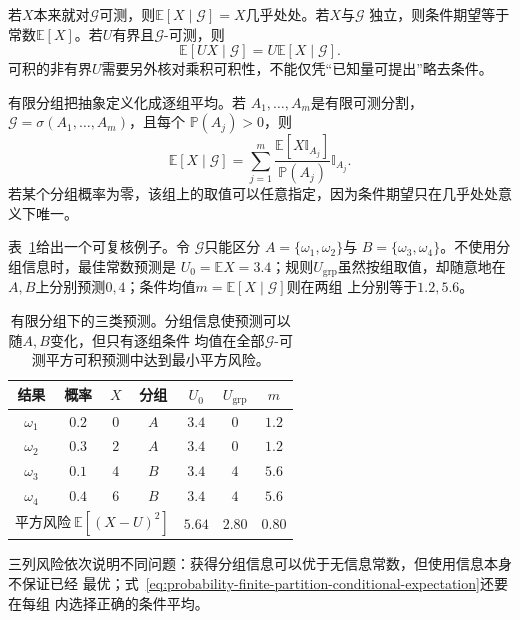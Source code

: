 若\(X\)本来就对\(\mathcal{G}\)可测，则\(\mathbb{E}[X\mid\mathcal{G}]=X\)几乎处处。若\(X\)与\(\mathcal{G}\)
独立，则条件期望等于常数\(\mathbb{E}[X]\)。若\(U\)有界且\(\mathcal{G}\)-可测，则
\begin{equation}
  \mathbb{E}[UX\mid\mathcal{G}]
  =
  U\mathbb{E}[X\mid\mathcal{G}].
  \label{eq:probability-taking-out-known-factor}
\end{equation}
可积的非有界\(U\)需要另外核对乘积可积性，不能仅凭“已知量可提出”略去条件。

有限分组把抽象定义化成逐组平均。若
\(A_1,\ldots,A_m\)是有限可测分割，
\(\mathcal{G}=\sigma(A_1,\ldots,A_m)\)，且每个
\(\mathbb{P}(A_j)>0\)，则
\begin{equation}
  \mathbb{E}[X\mid\mathcal{G}]
  =
  \sum_{j=1}^{m}
  \frac{\mathbb{E}[X\mathbb{I}_{A_j}]}
       {\mathbb{P}(A_j)}
  \mathbb{I}_{A_j}.
  \label{eq:probability-finite-partition-conditional-expectation}
\end{equation}
若某个分组概率为零，该组上的取值可以任意指定，因为条件期望只在几乎处处意义下唯一。

表~\ref{tab:probability-finite-partition-predictions}给出一个可复核例子。令
\(\mathcal{G}\)只能区分
\(A=\{\omega_1,\omega_2\}\)与
\(B=\{\omega_3,\omega_4\}\)。不使用分组信息时，最佳常数预测是
\(U_0=\mathbb{E}X=3.4\)；规则\(U_{\mathrm{grp}}\)虽然按组取值，却随意地在
\(A,B\)上分别预测\(0,4\)；条件均值\(m=\mathbb{E}[X\mid\mathcal{G}]\)则在两组
上分别等于\(1.2,5.6\)。
\begin{table}[htbp]
  \centering
  \small
  \begin{tabular}{ccccccc}
    \toprule
    结果 & 概率 & \(X\) & 分组 & \(U_0\) & \(U_{\mathrm{grp}}\) & \(m\) \\
    \midrule
    \(\omega_1\) & \(0.2\) & \(0\) & \(A\) & \(3.4\) & \(0\) & \(1.2\) \\
    \(\omega_2\) & \(0.3\) & \(2\) & \(A\) & \(3.4\) & \(0\) & \(1.2\) \\
    \(\omega_3\) & \(0.1\) & \(4\) & \(B\) & \(3.4\) & \(4\) & \(5.6\) \\
    \(\omega_4\) & \(0.4\) & \(6\) & \(B\) & \(3.4\) & \(4\) & \(5.6\) \\
    \midrule
    \multicolumn{4}{r}{平方风险\(\ \mathbb{E}[(X-U)^2]\)} &
    \(5.64\) & \(2.80\) & \(0.80\) \\
    \bottomrule
  \end{tabular}
  \caption{有限分组下的三类预测。分组信息使预测可以随\(A,B\)变化，但只有逐组条件
  均值在全部\(\mathcal{G}\)-可测平方可积预测中达到最小平方风险。}
  \label{tab:probability-finite-partition-predictions}
\end{table}
三列风险依次说明不同问题：获得分组信息可以优于无信息常数，但使用信息本身不保证已经
最优；式~\eqref{eq:probability-finite-partition-conditional-expectation}还要在每组
内选择正确的条件平均。


